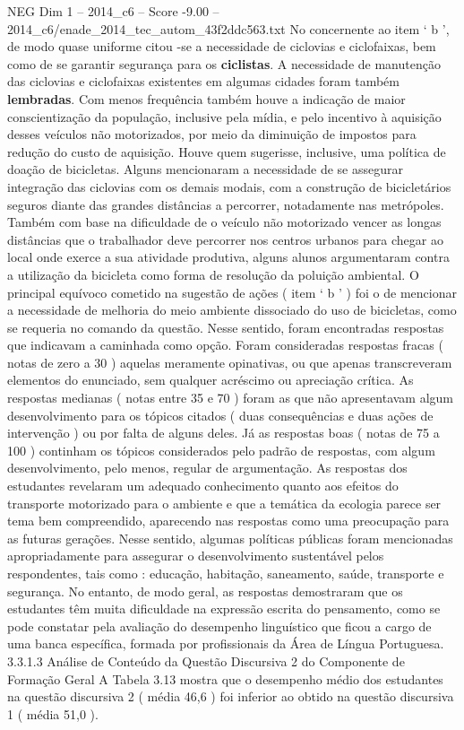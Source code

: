 \begin{textsample}{NEG Dim 1 – 2014\_c6 – Score -9.00 – 2014\_c6/enade\_2014\_tec\_autom\_43f2ddc563.txt}
No concernente ao item ‘ b ’, de modo quase uniforme citou -se a necessidade de ciclovias e ciclofaixas, bem como de se garantir segurança para os \textbf{ciclistas}.
A necessidade de manutenção das ciclovias e ciclofaixas existentes em algumas cidades foram também \textbf{lembradas}.
Com menos frequência também houve a indicação de maior conscientização da população, inclusive pela mídia, e pelo incentivo à aquisição desses veículos não motorizados, por meio da diminuição de impostos para redução do custo de aquisição.
Houve quem sugerisse, inclusive, uma política de doação de bicicletas.
Alguns mencionaram a necessidade de se assegurar integração das ciclovias com os demais modais, com a construção de bicicletários seguros diante das grandes distâncias a percorrer, notadamente nas metrópoles.
Também com base na dificuldade de o veículo não motorizado vencer as longas distâncias que o trabalhador deve percorrer nos centros urbanos para chegar ao local onde exerce a sua atividade produtiva, alguns alunos argumentaram contra a utilização da bicicleta como forma de resolução da poluição ambiental.
O principal equívoco cometido na sugestão de ações ( item ‘ b ’ ) foi o de mencionar a necessidade de melhoria do meio ambiente dissociado do uso de bicicletas, como se requeria no comando da questão.
Nesse sentido, foram encontradas respostas que indicavam a caminhada como opção.
Foram consideradas respostas fracas ( notas de zero a 30 ) aquelas meramente opinativas, ou que apenas transcreveram elementos do enunciado, sem qualquer acréscimo ou apreciação crítica.
As respostas medianas ( notas entre 35 e 70 ) foram as que não apresentavam algum desenvolvimento para os tópicos citados ( duas consequências e duas ações de intervenção ) ou por falta de alguns deles.
Já as respostas boas ( notas de 75 a 100 ) continham os tópicos considerados pelo padrão de respostas, com algum desenvolvimento, pelo menos, regular de argumentação.
As respostas dos estudantes revelaram um adequado conhecimento quanto aos efeitos do transporte motorizado para o ambiente e que a temática da ecologia parece ser tema bem compreendido, aparecendo nas respostas como uma preocupação para as futuras gerações.
Nesse sentido, algumas políticas públicas foram mencionadas apropriadamente para assegurar o desenvolvimento sustentável pelos respondentes, tais como : educação, habitação, saneamento, saúde, transporte e segurança.
No entanto, de modo geral, as respostas demostraram que os estudantes têm muita dificuldade na expressão escrita do pensamento, como se pode constatar pela avaliação do desempenho linguístico que ficou a cargo de uma banca específica, formada por profissionais da Área de Língua Portuguesa. 3.3.1.3 Análise de Conteúdo da Questão Discursiva 2 do Componente de Formação Geral A Tabela 3.13 mostra que o desempenho médio dos estudantes na questão discursiva 2 ( média 46,6 ) foi inferior ao obtido na questão discursiva 1 ( média 51,0 ).

\end{textsample}
